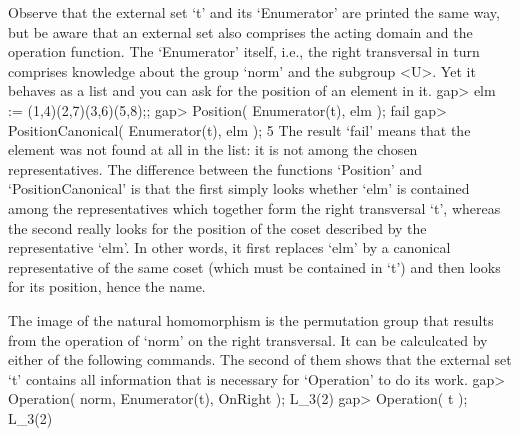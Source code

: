 Observe that the  external set `t' and  its `Enumerator' are  printed the
same way,  but be aware that an  external  set also comprises  the acting
domain and the  operation function.  The  `Enumerator' itself, i.e.,  the
right transversal in turn comprises  knowledge about the group `norm' and
the  subgroup <U>. Yet it   behaves as a  list and  you  can ask for  the
position of an element in it.
\beginexample
    gap> elm := (1,4)(2,7)(3,6)(5,8);;
    gap> Position( Enumerator(t), elm );
    fail
    gap> PositionCanonical( Enumerator(t), elm );
    5
\endexample
The result `fail'  means  that the element was   not found at all  in the
list: it is not among the chosen representatives. The difference
%
between the functions   `Position'  and `PositionCanonical' is   that the
first  simply looks whether  `elm' is contained among the representatives
which together form the right  transversal `t', whereas the second really
looks  for  the position of  the  coset  described  by the representative
`elm'.  In  other   words,  it  first    replaces `elm'  by  a  canonical
representative of  the same  coset (which must  be contained  in `t') and
then looks for its position, hence the name.

The  image  of the natural  homomorphism   is the permutation  group that
results from the operation of `norm' on the right  transversal. It can be
calculcated by either of the following commands. The second of them shows
that the external set `t' contains all information  that is necessary for
`Operation' to do its work.
\beginexample
    gap> Operation( norm, Enumerator(t), OnRight );
    L_3(2)
    gap> Operation( t );
    L_3(2)
\endexample


